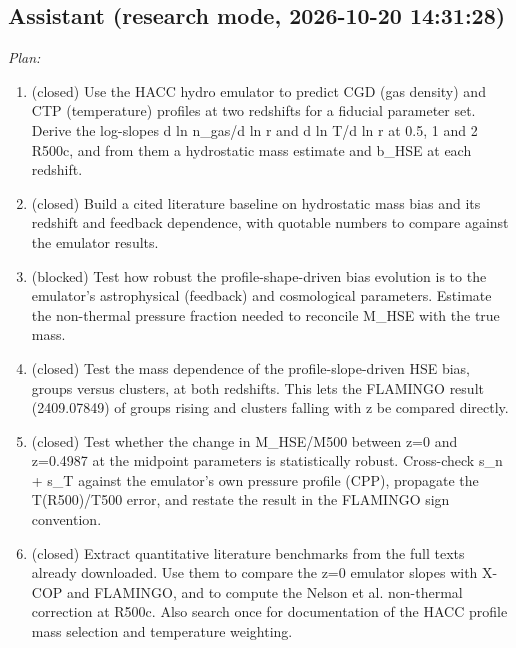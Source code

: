 \documentclass[11pt,a4paper]{article}
\begin{document}
\subsection*{Assistant \small(research mode, 2026-10-20 14:31:28)}
\textit{Plan:}\begin{enumerate}
  \item (closed) Use the HACC hydro emulator to predict CGD (gas density) and CTP (temperature) profiles at two redshifts for a fiducial parameter set. Derive the log-slopes d ln n\_gas/d ln r and d ln T/d ln r at 0.5, 1 and 2 R500c, and from them a hydrostatic mass estimate and b\_HSE at each redshift.
  \item (closed) Build a cited literature baseline on hydrostatic mass bias and its redshift and feedback dependence, with quotable numbers to compare against the emulator results.
  \item (blocked) Test how robust the profile-shape-driven bias evolution is to the emulator's astrophysical (feedback) and cosmological parameters. Estimate the non-thermal pressure fraction needed to reconcile M\_HSE with the true mass.
  \item (closed) Test the mass dependence of the profile-slope-driven HSE bias, groups versus clusters, at both redshifts. This lets the FLAMINGO result (2409.07849) of groups rising and clusters falling with z be compared directly.
  \item (closed) Test whether the change in M\_HSE/M500 between z=0 and z=0.4987 at the midpoint parameters is statistically robust. Cross-check s\_n + s\_T against the emulator's own pressure profile (CPP), propagate the T(R500)/T500 error, and restate the result in the FLAMINGO sign convention.
  \item (closed) Extract quantitative literature benchmarks from the full texts already downloaded. Use them to compare the z=0 emulator slopes with X-COP and FLAMINGO, and to compute the Nelson et al. non-thermal correction at R500c. Also search once for documentation of the HACC profile mass selection and temperature weighting.
\end{enumerate}
\end{document}
